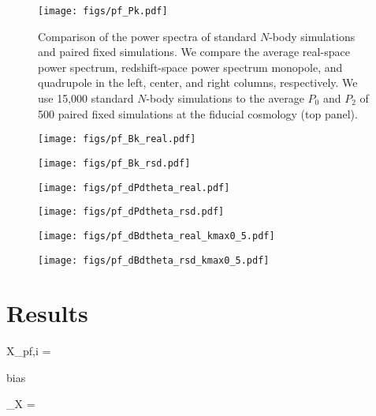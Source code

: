 \begin{figure}
\begin{center}
    \texttt{[image: figs/pf\_Pk.pdf]} 
    \caption{Comparison of the power spectra of standard $N$-body simulations 
    and paired fixed simulations. We compare the average real-space power spectrum, 
    redshift-space power spectrum monopole, and quadrupole in the left, center, 
    and right columns, respectively. We use 15,000 standard $N$-body simulations 
    to the average $P_0$ and $P_2$ of 500 paired fixed simulations at the 
    fiducial cosmology (top panel).
    }
\label{fig:pk_real}
\end{center}
\end{figure}


\begin{figure}
\begin{center}
    \texttt{[image: figs/pf\_Bk\_real.pdf]} 
    \caption{}
\label{fig:bk_real}
\end{center}
\end{figure}

\begin{figure}
\begin{center}
    \texttt{[image: figs/pf\_Bk\_rsd.pdf]} 
    \caption{}
\label{fig:bk_rsd}
\end{center}
\end{figure}

\begin{figure}
\begin{center}
    \texttt{[image: figs/pf\_dPdtheta\_real.pdf]}
    \caption{}
\label{fig:dpk_real}
\end{center}
\end{figure}

\begin{figure}
\begin{center}
    \texttt{[image: figs/pf\_dPdtheta\_rsd.pdf]}
    \caption{}
\label{fig:dpk_rsd}
\end{center}
\end{figure}

\begin{figure}
\begin{center}
    \texttt{[image: figs/pf\_dBdtheta\_real\_kmax0\_5.pdf]}
    \caption{}
\label{fig:dbk_real}
\end{center}
\end{figure}


\begin{figure}
\begin{center}
    \texttt{[image: figs/pf\_dBdtheta\_rsd\_kmax0\_5.pdf]}
    \caption{}
\label{fig:dbk_rsd}
\end{center}
\end{figure}



\section{Results} \label{sec:results} 
\beq
X_{{\rm pf},i} =  \big[ X_{{\rm pf},i}^{(1)} + X_{{\rm pf},i}^{(2)}\big]
\eeq

bias

\beq
\beta_X = 
\eeq
